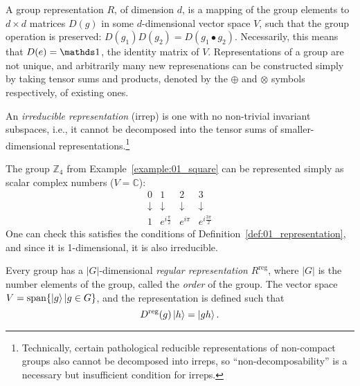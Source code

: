 \begin{definition}
\label{def:01_representation}
A group representation $R$, of dimension $d$, is a mapping of the group elements to $d\times d$ matrices $D(g)$ in some $d$-dimensional vector space $V$, such that the group operation is preserved: $D(g_1)D(g_2) = D(g_1 \bullet g_2)$.
Necessarily, this means that $D(e) = \identity$, the identity matrix of $V$.
Representations of a group are not unique, and arbitrarily many new represenations can be constructed simply by taking tensor sums and products, denoted by the $\oplus$ and $\otimes$ symbols respectively, of existing ones.
\end{definition}

\begin{definition}
\label{def:01_irreps}
An \textit{irreducible representation} (irrep) is one with no non-trivial invariant subspaces, i.e., it cannot be decomposed into the tensor sums of smaller-dimensional representations.\footnote{Technically, certain pathological reducible representations of non-compact groups also cannot be decomposed into irreps, so ``non-decomposability'' is a necessary but insufficient condition for irreps.}
\end{definition}

\begin{example}
\label{example:01_square_representation}
The group $\mathbb Z_4$ from Example~\ref{example:01_square} can be represented simply as scalar complex numbers ($V = \mathbb C$):
\begin{equation}
	\label{eq:01_z4_representation}
	\begin{array}{cccc}
	0 & 1 & 2 & 3 \\
	\downarrow & \downarrow & \downarrow & \downarrow \\
	1 & e^{i\frac{\pi}{2}} & e^{i\pi} & e^{i\frac{3\pi}{2}}
	\end{array}
\end{equation}
One can check this satisfies the conditions of Definition~\ref{def:01_representation}, and since it is 1-dimensional, it is also irreducible.
\end{example}

\begin{definition}
\label{def:01_symmetry_regular_representation}
Every group has a $|G|$-dimensional \textit{regular representation} $R^{\mathrm{reg}}$, where $|G|$ is the number elements of the group, called the \textit{order} of the group.
The vector space $V = \mathrm{span}\{\ket{g}|g\in G\}$, and the representation is defined such that
\begin{equation}
	\label{eq:01_regular_representation}
	D^{\mathrm{reg}}(g)\ket{h} = \ket{gh}.
\end{equation}
\end{definition}

